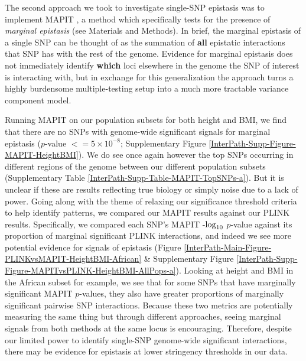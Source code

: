 \documentclass[12pt,a4paper]{article}
\def\log{{\rm log}}
\begin{document}
The second approach we took to investigate single-SNP epistasis was to implement MAPIT \citep{Crawford2017a}, a method which specifically tests for the presence of \textit{marginal epistasis} (see Materials and Methods). In brief, the marginal epistasis of a single SNP can be thought of as the summation of \textbf{all} epistatic interactions that SNP has with the rest of the genome. Evidence for marginal epistasis does not immediately identify \textbf{which} loci elsewhere in the genome the SNP of interest is interacting with, but in exchange for this generalization the approach turns a highly burdensome multiple-testing setup into a much more tractable variance component model.

Running MAPIT on our population subsets for both height and BMI, we find that there are no SNPs with genome-wide significant signals for marginal epistasis ($p$-value $<= 5\times10^{-8}$; Supplementary Figure \ref{InterPath-Supp-Figure-MAPIT-HeightBMI}). We do see once again however the top SNPs occurring in different regions of the genome between our different population subsets (Supplementary Table \ref{InterPath-Supp-Table-MAPIT-TopSNPs-a}). But it is unclear if these are results reflecting true biology or simply noise due to a lack of power. Going along with the theme of relaxing our significance threshold criteria to help identify patterns, we compared our MAPIT results against our PLINK results. Specifically, we compared each SNP's MAPIT -$\log_{10}$ $p$-value against its proportion of marginal significant PLINK interactions, and indeed we see more potential evidence for signals of epistasis (Figure \ref{InterPath-Main-Figure-PLINKvsMAPIT-HeightBMI-African} \& Supplementary Figure \ref{InterPath-Supp-Figure-MAPITvsPLINK-HeightBMI-AllPops-a}). Looking at height and BMI in the African subset for example, we see that for some SNPs that have marginally significant MAPIT $p$-values, they also have greater proportions of marginally significant pairwise SNP interactions. Because these two metrics are potentially measuring the same thing but through different approaches, seeing marginal signals from both methods at the same locus is encouraging. Therefore, despite our limited power to identify single-SNP genome-wide significant interactions, there may be evidence for epistasis at lower stringency thresholds in our data.
\end{document}
